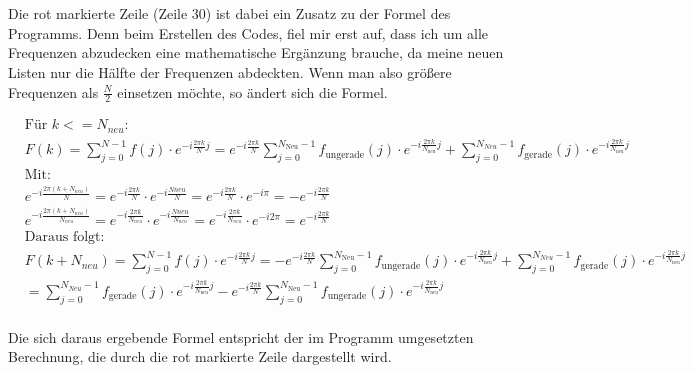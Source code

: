\documentclass[a4paper,12pt]{article}
\theoremstyle{definition}
\theoremstyle{remark}
\begin{document}
\\\\
Die rot markierte Zeile (Zeile 30) ist dabei ein Zusatz zu der Formel des Programms. Denn beim Erstellen des Codes, 
fiel mir erst auf, dass ich um alle Frequenzen abzudecken eine mathematische Ergänzung brauche, da meine neuen Listen 
nur die Hälfte der Frequenzen abdeckten. Wenn man also größere Frequenzen als $\frac{N}{2}$ einsetzen möchte, so ändert 
sich die Formel. 

\begin{align*}
&\text{Für $k <= N_{neu}$:}\\
&F(k) = \sum_{j=0}^{N-1}{f(j)\cdot e^{-i \frac{2\pi k}{N} j}} = e^{-i \frac{2\pi k}{N}} \sum_{j=0}^{N_{\text{Neu}}-1}{f_{\text{ungerade}}(j)\cdot e^{-i \frac{2\pi k}{N_{\text{neu}}} j}} + \sum_{j=0}^{N_{Neu}-1}{f_{\text{gerade}}(j)\cdot e^{-i \frac{2\pi k}{N_{\text{neu}}} j}}\\
&\text{Mit: }\\
&e^{-i \frac{2\pi(k+N_{neu})}{N}} = e^{-i \frac{2\pi k}{N}} \cdot e^{-i \frac{N{neu}}{N}} = e^{-i \frac{2\pi k}{N}} \cdot e^{-i\pi} = -e^{-i \frac{2\pi k}{N}}\\
&e^{-i \frac{2\pi(k+N_{neu})}{N_{neu}}} = e^{-i \frac{2\pi k}{N_{neu}}} \cdot e^{-i \frac{N{neu}}{N_{neu}}} = e^{-i \frac{2\pi k}{N_{neu}}} \cdot e^{-i2\pi} = e^{-i  \frac{2\pi k}{N}}\\
&\text{Daraus folgt: }\\
&F(k+N_{neu}) = \sum_{j=0}^{N-1}{f(j)\cdot e^{-i \frac{2\pi k}{N} j}} = -e^{-i \frac{2\pi k}{N}} \sum_{j=0}^{N_{\text{Neu}}-1}{f_{\text{ungerade}}(j)\cdot e^{-i \frac{2\pi k}{N_{\text{neu}}} j}} + \sum_{j=0}^{N_{Neu}-1}{f_{\text{gerade}}(j)\cdot e^{-i \frac{2\pi k}{N_{\text{neu}}} j}}\\
&= \sum_{j=0}^{N_{Neu}-1}{f_{\text{gerade}}(j)\cdot e^{-i \frac{2\pi k}{N_{\text{neu}}} j}} - e^{-i \frac{2\pi k}{N}} \sum_{j=0}^{N_{\text{Neu}}-1}{f_{\text{ungerade}}(j)\cdot e^{-i \frac{2\pi k}{N_{\text{neu}}} j}} \\
\end{align*}

Die sich daraus ergebende Formel entspricht der im Programm umgesetzten Berechnung, die durch die rot markierte Zeile 
dargestellt wird.
\end{document}
